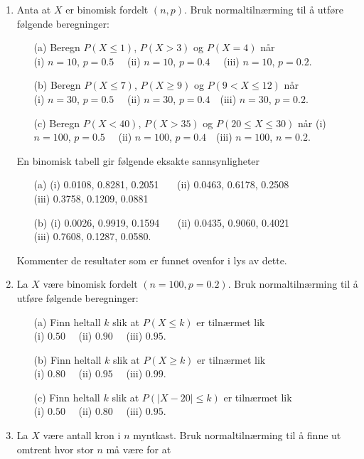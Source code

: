 \begin{enumerate}
\item Anta at $X$ er binomisk fordelt $(n,p)$. Bruk
     normaltilnærming til å utføre følgende beregninger:
     \begin{itemize}
     \item[(a)]  Beregn $P(X\leq 1)$, $P(X>3)$ og $P(X=4)$ når  \\
     (i) $n=10$, $p=0.5$  \ \ (ii) $n=10$, $p=0.4$  \ \ (iii) $n=10$, $p=0.2$.
     \item[(b)]  Beregn $P(X\leq 7)$, $P(X\geq 9)$ og $P(9<X\leq 12)$ når\\
        (i) $n=30$, $p=0.5$ \ \ (ii) $n=30$, $p=0.4$\ \ (iii) $n=30$, $p=0.2$.
     \item[(c)]  Beregn $P(X<40)$, $P(X>35)$ og $P(20\leq X\leq 30)$ når
     (i) $n=100$, $p=0.5$ \ \ (ii) $n=100$, $p=0.4$\ \ (iii) $n=100$, $n=0.2$.
     \end{itemize}
     En binomisk tabell gir følgende eksakte sannsynligheter
     \begin{itemize}
     \item[(a)] (i) 0.0108, 0.8281, 0.2051 \ \ \ (ii) 0.0463, 0.6178, 0.2508 \\
              (iii) 0.3758, 0.1209, 0.0881
     \item[(b)] (i) 0.0026, 0.9919, 0.1594 \ \ \ (ii) 0.0435, 0.9060, 0.4021 \\
              (iii) 0.7608, 0.1287, 0.0580.
     \end{itemize}
     Kommenter de resultater som er funnet ovenfor i lys av
     dette.

\item La $X$ være binomisk fordelt $(n=100, p=0.2)$. Bruk
     normaltilnærming til å utføre følgende beregninger:
     \begin{itemize}
     \item[(a)]  Finn heltall $k$ slik at $P(X\leq k)$ er tilnærmet lik \\
          (i) $0.50$ \ \  (ii) $0.90$ \ \ (iii) $0.95$.
     \item[(b)]  Finn heltall $k$ slik at $P(X\geq k)$ er tilnærmet lik  \\
          (i) $0.80$ \ \  (ii) $0.95$  \ \ (iii) $0.99$.
     \item[(c)]  Finn heltall $k$ slik at $P(\mid X-20\mid \leq k)$ er
          tilnærmet lik \\
          (i) $0.50$ \ \  (ii) $0.80$ \ \ (iii) $0.95$.
     \end{itemize}

\item La $X$ være antall kron i $n$ myntkast. Bruk
     normaltilnærming til å finne ut omtrent hvor stor $n$ må
     være for at
     

\end{enumerate}
